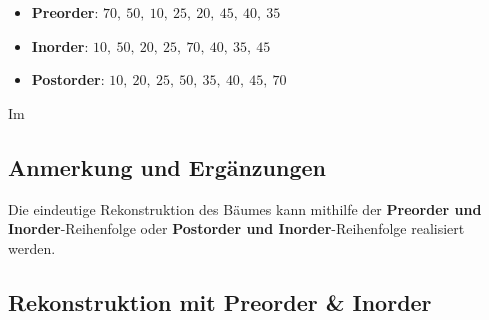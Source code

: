 \begin{itemize}
    \item \textbf{Preorder}: $70,\ 50,\ 10,\ 25,\ 20,\ 45,\ 40,\ 35$
    \item \textbf{Inorder}: $10,\ 50,\ 20,\ 25,\ 70,\ 40,\ 35,\ 45$
    \item \textbf{Postorder}: $10,\ 20,\ 25,\ 50,\ 35,\ 40,\ 45,\ 70$
\end{itemize}

Im \textbf{}


\subsection{Anmerkung und Ergänzungen}

Die eindeutige Rekonstruktion des Bäumes kann mithilfe der  \textbf{Preorder und Inorder}-Reihenfolge oder \textbf{Postorder und Inorder}-Reihenfolge realisiert werden.

\subsection*{Rekonstruktion mit Preorder \& Inorder}


